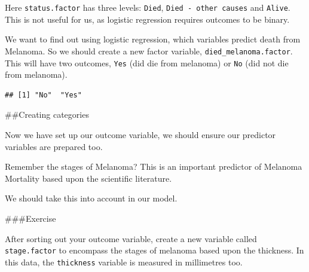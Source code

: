 \documentclass[]{book}
\makeatletter
\newenvironment{Shaded}{\begin{snugshade}}{\end{snugshade}}
\newcommand{\KeywordTok}[1]{\textcolor[rgb]{0.13,0.29,0.53}{\textbf{#1}}}
\newcommand{\NormalTok}[1]{#1}
\newcommand{\OperatorTok}[1]{\textcolor[rgb]{0.81,0.36,0.00}{\textbf{#1}}}
\newcommand{\StringTok}[1]{\textcolor[rgb]{0.31,0.60,0.02}{#1}}
\newenvironment{kframe}{%
\medskip{}
\setlength{\fboxsep}{.8em}
 \def\at@end@of@kframe{}%
 \ifinner\ifhmode%
  \def\at@end@of@kframe{\end{minipage}}%
  \begin{minipage}{\columnwidth}%
 \fi\fi%
 \def\FrameCommand##1{\hskip\@totalleftmargin \hskip-\fboxsep
 \colorbox{shadecolor}{##1}\hskip-\fboxsep
     \hskip-\linewidth \hskip-\@totalleftmargin \hskip\columnwidth}%
 \MakeFramed {\advance\hsize-\width
   \@totalleftmargin\z@ \linewidth\hsize
   \@setminipage}}%
 {\par\unskip\endMakeFramed%
 \at@end@of@kframe}
\renewenvironment{Shaded}{\begin{kframe}}{\end{kframe}}
\theoremstyle{definition}
\theoremstyle{definition}
\theoremstyle{definition}
\theoremstyle{remark}
\makeatother
\begin{document}
Here \texttt{status.factor} has three levels: \texttt{Died},
\texttt{Died\ -\ other\ causes} and \texttt{Alive}. This is not useful
for us, as logistic regression requires outcomes to be binary.

We want to find out using logistic regression, which variables predict
death from Melanoma. So we should create a new factor variable,
\texttt{died\_melanoma.factor}. This will have two outcomes,
\texttt{Yes} (did die from melanoma) or \texttt{No} (did not die from
melanoma).

\begin{Shaded}
\end{Shaded}

\begin{verbatim}
## [1] "No"  "Yes"
\end{verbatim}

\#\#Creating categories

Now we have set up our outcome variable, we should ensure our predictor
variables are prepared too.

Remember the stages of Melanoma? This is an important predictor of
Melanoma Mortality based upon the scientific literature.

We should take this into account in our model.

\#\#\#Exercise

After sorting out your outcome variable, create a new variable called
\texttt{stage.factor} to encompass the stages of melanoma based upon the
thickness. In this data, the \texttt{thickness} variable is measured in
millimetres too.
\end{document}
